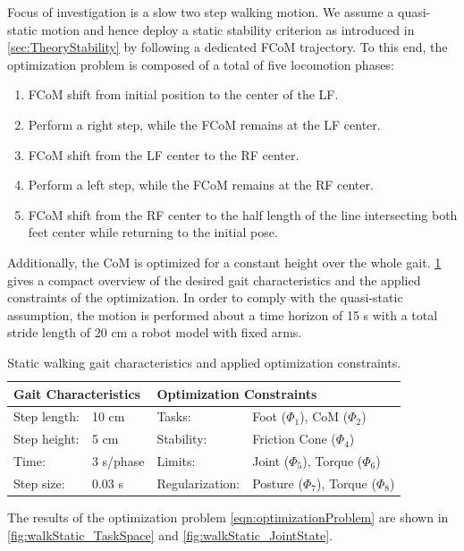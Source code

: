 Focus of investigation is a slow two step walking motion. We assume a quasi-static motion and hence deploy a static stability criterion as introduced in \cref{sec:TheoryStability} by following a dedicated \gls{FCoM} trajectory. To this end, the optimization problem is composed of a total of five locomotion phases: 
\begin{enumerate}
\item \gls{FCoM} shift from initial position to the center of the \gls{LF}.
\item Perform a right step, while the \gls{FCoM} remains at the \gls{LF} center. 
\item \gls{FCoM} shift from the \gls{LF} center to the \gls{RF} center. 
\item Perform a left step, while the \gls{FCoM} remains at the \gls{RF} center. 
\item \gls{FCoM} shift from the \gls{RF} center to the half length of the line intersecting both feet center while returning to the initial pose. 
\end{enumerate}
Additionally, the \gls{CoM} is optimized for a constant height over the whole gait. \cref{tab:walkStatic} gives a compact overview of the desired gait characteristics and the applied constraints of the optimization. In order to comply with the quasi-static assumption, the motion is performed about a time horizon of 15 s with a total stride length of 20 cm a robot model with fixed arms. 
\begin{table}[]
\centering
\caption[Static walking gait characteristics and optimization constraints]{Static walking gait characteristics and applied optimization constraints.}
\begin{tabular}{|ll|ll|}
\hline
\multicolumn{2}{|l|}{\textbf{Gait Characteristics}} & \multicolumn{2}{l|}{\textbf{Optimization Constraints}} \\ \hline
Step length:& 10 cm 	& Tasks: 			& Foot ($\Phi_1$), \gls{CoM} ($\Phi_2$)\\ \hline
Step height:& 5 cm 	& Stability: 		& Friction Cone ($\Phi_4$)\\ \hline
Time:& 3 s/phase 	& Limits: 			& Joint ($\Phi_5$), Torque ($\Phi_6$)\\ \hline
Step size:& 0.03 s	& Regularization: 	& Posture ($\Phi_7$), Torque ($\Phi_8$)\\ \hline
\end{tabular}
\label{tab:walkStatic}
\end{table}

The results of the optimization problem \cref{eqn:optimizationProblem} are shown in \cref{fig:walkStatic_TaskSpace} and \cref{fig:walkStatic_JointState}.

